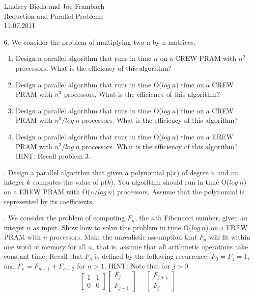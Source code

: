 \documentclass[10pt]{article}
\begin{document}
	\begin{flushright}
	Lindsey Bieda and Joe Frambach\\
	Reduction and Parallel Problems\\
	11.07.2011
	\end{flushright}

6. We consider the problem of multiplying two n by n matrices.\\
\begin{enumerate}
\item Design a parallel algorithm that runs in time $n$ on a CREW PRAM with $n^2$
processors. What is the efficiency of this algorithm?
\item Design a parallel algorithm that runs in time O($log~n$) time on a CREW PRAM with $n^3$
processors. What is the efficiency of this algorithm?
\item Design a parallel algorithm that runs in time O($log~n$) time on a CREW PRAM with $n^3/log~n$
processors. What is the efficiency of this algorithm?
\item Design a parallel algorithm that runs in time O($log~n$) time on a EREW PRAM with $n^3/log~n$
processors. What is the efficiency of this algorithm? HINT: Recall problem 3.
\end{enumerate}

. Design a parallel algorithm that given a polynomial p($x$) of degree $n$ and an integer $k$ computes the value
of p($k$). You algorithm should run in time O($log~n$) on a EREW PRAM with O($n/log~n$) processors.
Assume that the polynomial is represented by its coefficients.

. We consider the problem of computing $F_n$, the $n$th Fibonacci number, given an integer $n$ as input.
Show how to solve this problem in time O($log~n$) on a EREW PRAM with $n$ processors. Make the
unrealistic assumption that $F_n$ will fit within one word of memory for all $n$, that is, assume that
all arithmetic operations take constant time. Recall that $F_n$ is defined by the following recurrence:
$F_{0} = F_{1} = 1$, and $F_{n} = F_{n-1} + F_{n-2}$ for $n > 1$.
HINT: Note that for $j > 0$
\[
\left[ \begin{array}{cc}
1 & 1\\
0 & 0
\end{array} \right]
\left[ \begin{array}{c}
F_j\\
F_{j-1}
\end{array} \right]
=
\left[ \begin{array}{c}
F_{j+1}\\
F_j
\end{array} \right]
\]
\end{document}
